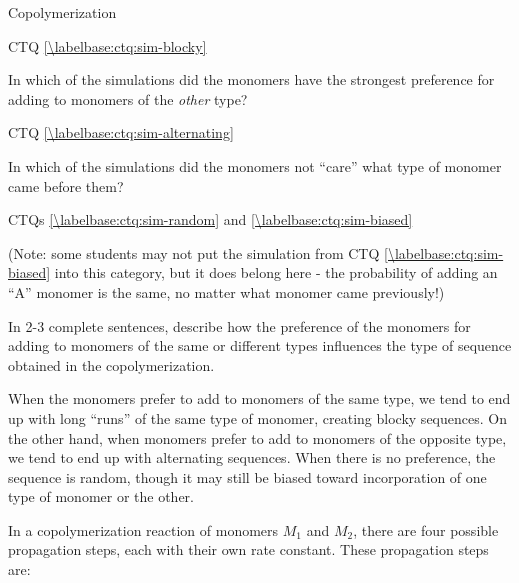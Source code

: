 \begin{activity}{Copolymerization}
\begin{ctqs}
		\begin{solution}[0.85in]{}
			CTQ \ref{\labelbase:ctq:sim-blocky}
		\end{solution}
	
	\question In which of the simulations did the monomers have the strongest preference for adding to monomers of the \emph{other} type?
	
		\begin{solution}[0.85in]{}
			CTQ \ref{\labelbase:ctq:sim-alternating}
		\end{solution}
	
	\question In which of the simulations did the monomers not ``care'' what type of monomer came before them?
	
		\begin{solution}[0.85in]{}
			CTQs \ref{\labelbase:ctq:sim-random} and  \ref{\labelbase:ctq:sim-biased}
			
			(Note: some students may not put the simulation from CTQ \ref{\labelbase:ctq:sim-biased} into this category, but it does belong here - the probability of adding an ``A'' monomer is the same, no matter what monomer came previously!)
		\end{solution}
	
	\question In 2-3 complete sentences, describe how the preference of the monomers for adding to monomers of the same or different types influences the type of sequence obtained in the copolymerization.
	
		\begin{solution}[2in]{}
			When the monomers prefer to add to monomers of the same type, we tend to end up with long ``runs'' of the same type of monomer, creating blocky sequences.  On the other hand, when monomers prefer to add to monomers of the opposite type, we tend to end up with alternating sequences.  When there is no preference, the sequence is random, though it may still be biased toward incorporation of one type of monomer or the other.
		\end{solution}
\end{ctqs}

\begin{model}
\label{\labelbase:mdl:kinetics}

	In a copolymerization reaction of monomers $M_1$ and $M_2$, there are four possible propagation steps, each with their own rate constant.  These propagation steps are:
	

\end{model}
\end{activity}
